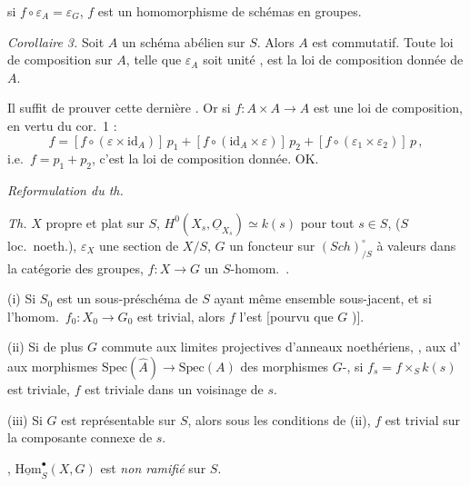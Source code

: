 \documentclass[11pt,a4paper]{article}
\begin{document}
 \ill{} si $f \circ \varepsilon_A = \varepsilon_G$, $f$ est un homomorphisme de schémas en groupes.

\emph{Corollaire 3.} Soit $A$ un schéma abélien sur $S$. Alors $A$ est commutatif. Toute loi de composition sur $A$, telle que $\varepsilon_A$ \struck{\ill{}} soit  unité , est la loi de composition donnée de $A$.

Il suffit de prouver cette dernière . Or si $f \colon A \times A \to A$ est une loi de composition, en vertu du cor.~1 :
\[
  f = [f \circ (\varepsilon \times \mathrm{id}_A)]\, p_1 + [f \circ (\mathrm{id}_A \times \varepsilon)]\, p_2 + [f \circ (\varepsilon_1 \times \varepsilon_2)]\, p\,,
\]
i.e.\ $f = p_1 + p_2$, c'est la loi de composition donnée. OK.

\emph{Reformulation du th.}

\emph{Th.} $X$ propre et plat sur $S$, $H^0(X_s, \underline{O}_{X_s}) \simeq k(s)$ pour tout $s \in S$, ($S$ loc.\ noeth.), $\varepsilon_X$ une section de $X/S$,  $G$ un foncteur sur \struck{\ill{}} $(\mathit{Sch})_{/S}^{\circ}$ à valeurs dans la catégorie des groupes, $f \colon X \to G$ un $S$-homom.\ . \struck{\ill{} \ill{} \ill{} \ill{} \ill{}} 

(i) Si $S_0$ est un sous-préschéma \emph{} de $S$ ayant même ensemble sous-jacent, et si  l'homom.\ $f_0 \colon X_0 \to G_0$ est trivial, alors $f$ l'est [pourvu que $G$ \ill{} \ill{} \ill{} )].

(ii) Si de plus $G$ commute aux limites projectives  d'anneaux noethériens, \ill{} \ill{}, aux  d'  \ill{} \ill{} \ill{} aux morphismes $\mathrm{Spec}(\widehat{A}) \to \mathrm{Spec}(A)$ des morphismes \ill{} \ill{} $G$-\ill{},  si $f_s = f \times_S k(s)$ est triviale, $f$ est triviale dans un voisinage de $s$.

(iii) Si $G$ est représentable  sur $S$, alors sous les conditions de (ii), \struck{\ill{}} $f$ est trivial sur la composante connexe de $s$.

 \ill{} , $\underline{\mathrm{Hom}}_S^{\bullet}(X, G)$ est \emph{non ramifié} sur $S$.
\end{document}
